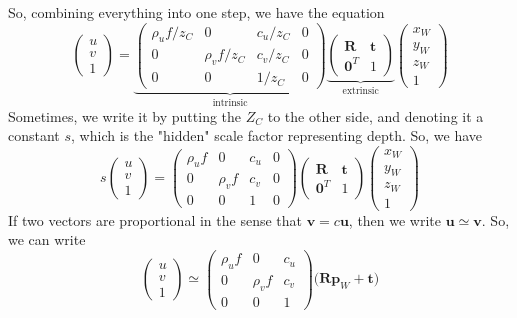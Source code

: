 \documentclass{article}
\begin{document}
  So, combining everything into one step, we have the equation 
  \begin{equation}
    \begin{pmatrix} u \\ v \\ 1 \end{pmatrix} = \underbrace{\begin{pmatrix} \rho_u f / z_C & 0 & c_u / z_C & 0\\
      0 & \rho_v f / z_C & c_v / z_C & 0 \\
      0 & 0 & 1/z_C & 0 \end{pmatrix}}_{\text{intrinsic}} \underbrace{\begin{pmatrix} \mathbf{R} & \mathbf{t} \\ \mathbf{0}^T & 1 \end{pmatrix}}_{\text{extrinsic}} \begin{pmatrix} x_W \\ y_W \\ z_W \\ 1 \end{pmatrix}
  \end{equation}
  Sometimes, we write it by putting the $Z_C$ to the other side, and denoting it a constant $s$, which is the "hidden" scale factor representing depth. So, we have 
  \begin{equation}
    s \begin{pmatrix} u \\ v \\ 1 \end{pmatrix} = \begin{pmatrix} \rho_u f & 0 & c_u & 0\\
     0 & \rho_v f & c_v & 0 \\
     0 & 0 & 1 & 0 \end{pmatrix} \begin{pmatrix} \mathbf{R} & \mathbf{t} \\ \mathbf{0}^T & 1 \end{pmatrix} \begin{pmatrix} x_W \\ y_W \\ z_W \\ 1 \end{pmatrix}
  \end{equation}
  If two vectors are proportional in the sense that $\mathbf{v} = c \mathbf{u}$, then we write $\mathbf{u} \simeq \mathbf{v}$. So, we can write 
  \begin{equation}
    \begin{pmatrix} u \\ v \\ 1 \end{pmatrix} \simeq \begin{pmatrix} \rho_u f & 0 & c_u\\
      0 & \rho_v f & c_v \\
      0 & 0 & 1 \end{pmatrix} \big( \mathbf{R} \mathbf{p}_W + \mathbf{t} \big)
  \end{equation}
\end{document}

